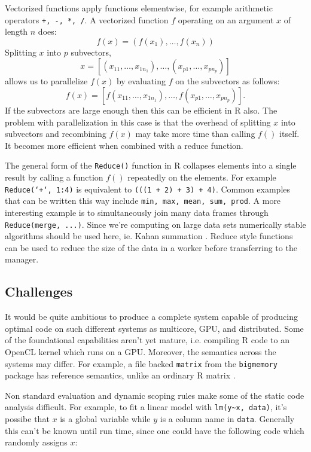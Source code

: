 \documentclass[12pt]{article}
\begin{document}
Vectorized functions apply functions elementwise, for example arithmetic
operators \texttt{+, -, *, /}. A vectorized function $f$
operating on an argument $x$ of length $n$ does:
\begin{equation}
\label{eq:vectorization}
    f(x) = (f(x_1), \dots, f(x_n))
\end{equation}
Splitting $x$ into $p$ subvectors, 
\[
    x = \left[ (x_{11}, \dots, x_{1 n_1}), \dots, (x_{p 1}, \dots, x_{p
n_p}) \right]
\]
allows us to parallelize $f(x)$ by evaluating $f$ on the subvectors as follows:
\[
    f(x) = \left[ f(x_{11}, \dots, x_{1 n_1}), \dots, f(x_{p 1}, \dots, x_{p
n_p}) \right].
\]
If the subvectors are large enough then this can be efficient in R also.
The problem with parallelization in this case is that the overhead of
splitting $x$ into subvectors and recombining $f(x)$ may take more time
than calling $f()$ itself. It becomes more efficient when combined with
a reduce function.

The general form of the \texttt{Reduce()} function in R collapses elements
into a single result by calling a function $f()$ repeatedly on the
elements. For example \texttt{Reduce(`+`, 1:4)} is equivalent to
\texttt{(((1 + 2) + 3) + 4)}. Common examples that can be written this way
include \texttt{min, max, mean, sum, prod}. A more interesting example is
to simultaneously join many data frames through \texttt{Reduce(merge,
...)}.  Since we're computing on large data sets numerically stable
algorithms should be used here, ie.  Kahan summation \cite{Robey2011217}.
Reduce style functions can be used to reduce the size of the data in a
worker before transferring to the manager.

\subsection{Challenges}

It would be quite ambitious to produce a complete system capable of
producing optimal code on such different systems as multicore, GPU, and
distributed. Some of the foundational capabilities aren't yet mature, i.e.
compiling R code to an OpenCL kernel which runs on a GPU. Moreover, the
semantics across the systems may differ. For example, a file backed
\texttt{matrix} from the \texttt{bigmemory} package has reference
semantics, unlike an ordinary R matrix \cite{bigmemory}.

Non standard evaluation and dynamic scoping rules make some of the
static code analysis difficult. For example, to fit a linear model with
\texttt{lm(y\textasciitilde x, data)}, it's possibe that $x$ is a global variable while
$y$ is a column name in \texttt{data}. Generally this can't be known until
run time, since one could have the following code which randomly assigns
$x$:
\end{document}
